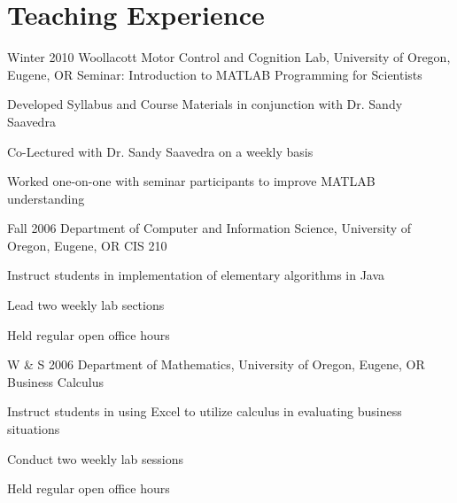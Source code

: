 \documentclass[10pt]{article} %
\begin{document}
\section{Teaching Experience}

\class
{Winter 2010}
{Woollacott Motor Control and Cognition Lab, University of Oregon, Eugene, OR}
{Seminar: Introduction to MATLAB Programming for Scientists}
{
\begin{itemize-noindent}
\setlength\itemsep{0.12em}
\item{Developed Syllabus and Course Materials in conjunction with Dr. Sandy Saavedra}
\item{Co-Lectured with Dr. Sandy Saavedra on a weekly basis}
\item{Worked one-on-one with seminar participants to improve MATLAB understanding}
\end{itemize-noindent}
}


\class
{Fall 2006}
{Department of Computer and Information Science, University of Oregon, Eugene, OR}
{CIS 210}
{
\begin{itemize-noindent}
\setlength\itemsep{0.12em}
\item{Instruct students in implementation of elementary algorithms in Java}
\item{Lead two weekly lab sections}
\item{Held regular open office hours}
\end{itemize-noindent}
}


\class
{W \& S 2006}
{Department of Mathematics, University of Oregon, Eugene, OR}
{Business Calculus}
{
\begin{itemize-noindent}
\setlength\itemsep{0.12em}
\item{Instruct students in using Excel to utilize calculus in evaluating business situations}
\item{Conduct two weekly lab sessions}
\item{Held regular open office hours}
\end{itemize-noindent}
}

\renewcommand\bibname{Publications}



\end{document}

